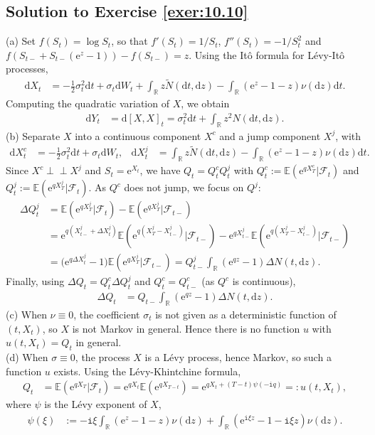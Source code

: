 \documentclass[12pt]{book}
\numberwithin{equation}{chapter}
\theoremstyle{plain}
\numberwithin{theorem}{section}
\theoremstyle{definition}
\numberwithin{exercise}{chapter}
\newcommand{\<}{\langle}
\renewcommand{\>}{\rangle}
\renewcommand{\(}{\left(}
\renewcommand{\)}{\right)}
\renewcommand{\[}{\left[}
\renewcommand{\]}{\right]}
\newcommand\Eb{\mathds{E}}
\newcommand\Rb{\mathds{R}}
\newcommand\Fc{\mathscr{F}}
\newcommand\sig{\sigma}
\newcommand\Del{\Delta}
\newcommand\Nt{\widetilde{N}}
\newcommand{\ind}{\perp \! \! \! \perp}
\newcommand\ii{\mathtt{i}}
\newcommand\dd{\mathrm{d}}
\newcommand\ee{\mathrm{e}}
\begin{document}
\subsection*{Solution to Exercise \ref{exer:10.10}}
(a) Set $f(S_t) = \log S_t$, so that $f'(S_t) = 1/S_t$, $f''(S_t) = -1/S_t^2$ and $f( S_{t-} + S_{t-} (\ee^z - 1) ) - f(S_{t-}) = z$.  Using the It\^o formula for L\'evy-It\^o processes,
\begin{align}
\dd X_t
	&=	- \frac{1}{2} \sig_t^2 \dd t + \sig_t \dd W_t + \int_\Rb z \Nt(\dd t, \dd z) - \int_\Rb ( \ee^z - 1 - z) \nu( \dd z ) \dd t .
\end{align}
Computing the quadratic variation of $X$, we obtain
\begin{align}
\dd Y_t
	&=	\dd [ X, X ]_t
	=		\sig_t^2 \dd t + \int_\Rb z^2 N(\dd t, \dd z) .
\end{align}
(b) Separate $X$ into a continuous component $X^c$ and a jump component $X^j$, with
\begin{align}
\dd X_t^c
	&=	- \frac{1}{2} \sig_t^2 \dd t + \sig_t \dd W_t , &
\dd X_t^j
	&=	\int_\Rb z \Nt(\dd t, \dd z) - \int_\Rb ( \ee^z - 1 - z) \nu( \dd z ) \dd t .
\end{align}
Since $X^c \ind X^j$ and $S_t = \ee^{X_t}$, we have $Q_t = Q_t^c Q_t^j$ with $Q_t^c := \Eb( \ee^{q X_T^c} | \Fc_t )$ and $Q_t^j := \Eb( \ee^{q X_T^j} | \Fc_t )$.  As $Q^c$ does not jump, we focus on $Q^j$:
\begin{align}
\Del Q_t^j
	&=	\Eb( \ee^{q X_T^j} | \Fc_t ) - \Eb( \ee^{q X_T^j} | \Fc_{t-} ) \\
	&=	\ee^{q (X_{t-}^j + \Del X_t^j)} \Eb( \ee^{q (X_T^j -  X_{t-}^j)} | \Fc_{t-} ) - \ee^{q X_{t-}^j} \Eb( \ee^{q (X_T^j -  X_{t-}^j)} | \Fc_{t-} ) \\
	&=	\Big( \ee^{q \Del X_t^j} - 1 \Big) \Eb( \ee^{q X_T^j} | \Fc_{t-} ) 
	=		Q_{t-}^j  \int_\Rb ( \ee^{qz} - 1 ) \Del N(t, \dd z) .
\end{align}
Finally, using $\Del Q_t = Q_t^c \Del Q_t^j$ and $Q_t^c = Q_{t-}^c$ (as $Q^c$ is continuous),
\begin{align}
\Del Q_t
	&=	Q_{t-} \int_\Rb ( \ee^{qz} - 1 ) \Del N(t, \dd z) .
\end{align}
(c) When $\nu \equiv 0$, the coefficient $\sig_t$ is not given as a deterministic function of $(t,X_t)$, so $X$ is not Markov in general.  Hence there is no function $u$ with $u(t,X_t) = Q_t$ in general.
\\[0.5em]
(d) When $\sig \equiv 0$, the process $X$ is a L\'evy process, hence Markov, so such a function $u$ exists.  Using the L\'evy-Khintchine formula,
\begin{align}
Q_t
	&=	\Eb( \ee^{q X_T} | \Fc_t ) 
	=		\ee^{q X_t} \Eb( \ee^{q X_{T-t}} ) 
	=		\ee^{q X_t + (T-t) \psi(-\ii q) }
	=:	u(t,X_t) , 
\end{align}
where $\psi$ is the L\'evy exponent of $X$,
\begin{align}
\psi(\xi)
	&:= - \ii \xi \int_\Rb (\ee^z - 1 - z)\nu(\dd z) + \int_\Rb (\ee^{\ii \xi z} - 1 - \ii \xi z) \nu( \dd z) .
\end{align}
\end{document}
